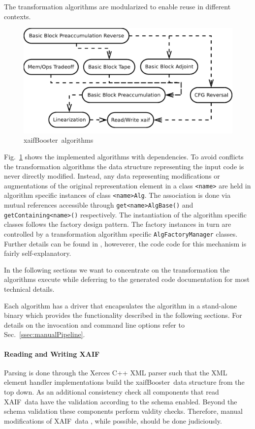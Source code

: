 \documentclass[11pt]{article}
\newcommand{\xaif}{XAIF}
\newcommand{\xaifBooster}{xaifBooster}
\newcommand{\refsec}[1]{{Sec.~\ref{#1}}}
\newcommand{\reffig}[1]{{Fig.~\ref{#1}}}
\begin{document}
The transformation algorithms are modularized to enable reuse in different 
contexts. 
\begin{figure}
\centering \includegraphics[width=.45\textwidth]{allAlgs}
\caption{\xaifBooster\ algorithms} \label{fig:allAlgs}
\end{figure}
\reffig{fig:allAlgs} shows the implemented algorithms with dependencies.
To avoid conflicts the transformation algorithms the data structure representing the input code  
is never directly modified. 
Instead, any data representing modifications or augmentations of the 
original representation element in a class {\tt <name>}
are held in algorithm specific instances of class {\tt <name>Alg}.
The association is done via mutual references accessible 
through {\tt get<name>AlgBase()} and {\tt getContaining<name>()} respectively.
The instantiation of the algorithm specific classes follows 
the factory design pattern. The factory instances in turn are controlled 
by a transformation algorithm specific {\tt AlgFactoryManager} classes. 
Further details can be found in \cite{sea2003}, howeverer, the code 
code for this mechanism is fairly self-explanatory.  
  
In the following sections we want to concentrate on the transformation 
the algorithms execute while deferring to the generated code 
documentation for most technical details.

 

Each algorithm has a driver that encapsulates the algorithm 
in a stand-alone binary which provides the functionality described 
in the following 
sections. For details on the invocation and command line options refer to 
\refsec{ssec:manualPipeline}.

\paragraph{Reading and Writing \xaif}
Parsing is done through the Xerces C++ XML parser \cite{xercesWeb}
such that the XML element handler implementations build the \xaifBooster\ data 
structure from the top down. 
As an additional consistency check all components that read \xaif\ data 
have the validation according to the schema enabled. Beyond the schema 
validation these components perform valdity checks. Therefore, 
manual modifications of \xaif\ data , while possible, should 
be done judiciously. 
\end{document}
